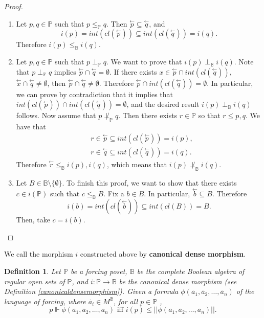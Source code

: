 \documentclass[10pt,longbibliography]{article}
\newtheorem{Def}[Theo]{Definition}
\newcommand{\Po}{\mathbb{P}}
\newcommand{\B}{\mathbb{B}}
\newcommand{\lp}{\overset{\leftarrow}{p}}
\begin{document}
\begin{proof}
\begin{enumerate}
		\item Let $p,q \in \Po$ such that $p \leq_{\Po} q$. Then $\overset{\leftarrow}{p} \subseteq \overset{\leftarrow}{q}$, and $$i(p) = int(cl(\overset{\leftarrow}{p})) \subseteq int(cl(\overset{\leftarrow}{q})) = i(q).$$
		Therefore $i(p) \leq_{\B} i(q).$
		\item Let $p,q \in \Po$ such that $p \perp_{\Po} q$. We want to prove that $i(p) \perp_{\B} i(q)$. Note that $p \perp_{\Po} q$ implies $\overset{\leftarrow}{p} \cap \overset{\leftarrow}{q} = \emptyset$. If there exists $ x \in \overset{\leftarrow}{p} \cap int(cl(\overset{\leftarrow}{q}))$,  $\overset{\leftarrow}{x} \cap \overset{\leftarrow}{q} \neq \emptyset$, then $\overset{\leftarrow}{p} \cap \overset{\leftarrow}{q} \neq \emptyset$. Therefore $\overset{\leftarrow}{p} \cap int(cl(\overset{\leftarrow}{q})) =  \emptyset$. In particular, we can prove by contradiction that it implies that $int(cl(\overset{\leftarrow}{p})) \cap int(cl(\overset{\leftarrow}{q})) = \emptyset$, and the desired result $i(p) \perp_{\B} i(q)$ follows. Now assume that $p \not \perp_{\Po} q$. Then there exists $r \in \Po$ so that $r \leq p,q$. We have that
		\begin{align*}
			&r \in \lp \subseteq int(cl(\lp)) = i(p), \\
			&r \in \overset{\leftarrow}{q} \subseteq int(cl(\overset{\leftarrow}{q})) = i(q).
		\end{align*}
		Therefore $\overset{\leftarrow}{r} \leq_{\B} i(p),i(q)$, which means that $i(p) \not \perp_{\B} i(q)$.
		
		\item Let $B \in \B \setminus \{\emptyset\}$. To finish this proof, we want to show that there exists $c \in i(\Po)$ such that $c \leq_{\B} B$. Fix a $b \in B$. In particular, $\overset{\leftarrow}{b} \subseteq B$. Therefore $$i(b) = int(cl(\overset{\leftarrow}{b})) \subseteq int(cl(B)) = B.$$
		Then, take $c = i(b)$.
		
	\end{enumerate}
\end{proof}

We call the morphism $i$ constructed above by \textbf{canonical dense morphism}.


\begin{Def}\label{forcingrelationbooleanalgebra}
	Let $\Po$ be a forcing poset, $\B$ be the complete Boolean algebra of regular open sets of $\Po$, and $i: \Po \to \B$ be the canonical dense morphism (see Definition \ref{canonicaldensemorphism}). Given a formula $\phi(\overset{.}{a}_{1},\overset{.}{a}_{2}, \dots, \overset{.}{a}_{n})$ of the language of forcing, where $\overset{.}{a}_{i} \in M^{\B}$, for all $p \in \Po$ ,
	$$p \Vdash \phi(\overset{.}{a}_{1},\overset{.}{a}_{2}, \dots, \overset{.}{a}_{n}) \text{ iff }  i(p) \leq ||\phi(\overset{.}{a}_{1},\overset{.}{a}_{2}, \dots, \overset{.}{a}_{n})||.$$
\end{Def}
\end{document}
